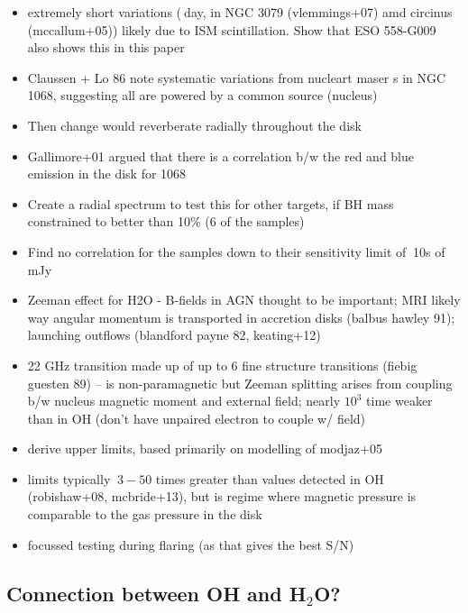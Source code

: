 \begin{itemize}
\item extremely short variations ($~$day, in NGC 3079 (vlemmings+07) amd circinus (mccallum+05)) likely due to ISM scintillation. Show that ESO 558-G009 also shows this in this paper
\item Claussen + Lo 86 note systematic variations from nucleart maser s in NGC 1068, suggesting all are powered by a common source (nucleus)
\item Then change would reverberate radially throughout the disk
\item Gallimore+01 argued that there is a correlation b/w the red and blue emission in the disk for 1068
\item Create a radial spectrum to test this for other targets, if BH mass constrained to better than 10\% (6 of the samples)
\item Find no correlation for the samples down to their sensitivity limit of $~$10s of mJy
\item Zeeman effect for H2O - B-fields in AGN thought to be important; MRI likely way angular momentum is transported in accretion disks (balbus hawley 91); launching outflows (blandford payne 82, keating+12)
\item 22 GHz transition made up of up to 6 fine structure transitions (fiebig guesten 89) -- is non-paramagnetic but Zeeman splitting arises from coupling b/w nucleus magnetic moment and external field; nearly $10^3$ time weaker than in OH (don't have unpaired electron to couple w/ field)
\item derive upper limits, based primarily on modelling of modjaz+05
\item limits typically $~3-50$ times greater than values detected in OH (robishaw+08, mcbride+13), but is regime where magnetic pressure is comparable to the gas pressure in the disk
\item focussed testing during flaring (as that gives the best S/N)
\end{itemize}

\subsection{Connection between OH and H$_2$O?}
\label{sec:oh_and_h2o}

